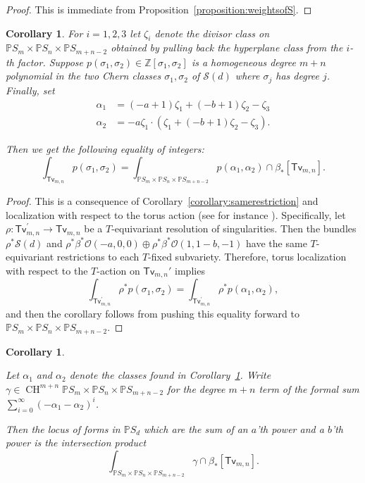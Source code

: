 \documentclass[12pt]{article}
\theoremstyle{plain}
\newtheorem{corollary}[theorem]{Corollary}
\theoremstyle{remark}
\renewcommand{\P}{\mathbb{P}}
\newcommand{\CH}{\operatorname{CH}}
\newcommand{\Z}{\mathbb{Z}}
\renewcommand{\O}{\mathscr{O}}
\renewcommand{\S}{\mathscr{S}}
\newcommand{\transvectant}{\mathsf{Tv}}
\begin{document}
\begin{proof}
    \label{proof:samerestriction}
    This is immediate from Proposition~\ref{proposition:weightsofS}.
\end{proof}


\begin{corollary}
    \label{corollary:intersectionnumbers}
    For $i = 1,2,3$ let $\zeta_{i}$ denote the divisor class on $\P S_{m} \times \P S_{n} \times \P S_{m+n-2}$ obtained by pulling back the hyperplane class from the $i$-th factor.  Suppose $p(\sigma_1,\sigma_2) \in \Z[\sigma_1,\sigma_2]$ is a homogeneous degree $m+n$ polynomial in the two Chern classes $\sigma_1,\sigma_2$ of $\S(d)$ where $\sigma_j$ has degree $j$.   Finally, set
    \begin{align*}
        \alpha_{1} &= (-a+1)\zeta_1 + (-b+1)\zeta_2 - \zeta_3\\
        \alpha_{2} &= -a\zeta_1 \cdot \left(\zeta_1 + (-b+1)\zeta_2 - \zeta_3\right).
    \end{align*}

    Then we get the following equality of integers: \[\int_{\transvectant_{m,n}} p(\sigma_1,\sigma_2) = \int_{\P S_{m} \times \P S_{n} \times \P S_{m+n-2}} p(\alpha_1,\alpha_2) \cap \beta_{*}[\transvectant_{m,n}].\]
\end{corollary}

\begin{proof}
    \label{proof:intersectionnumbers}
    This is a consequence of Corollary~\ref{corollary:samerestriction} and localization with respect to the torus action (see for instance \cite{edidin1998localization}).  Specifically, let $\rho: \transvectant_{m,n}^{'} \to \transvectant_{m,n}$ be a $T$-equivariant resolution of singularities. Then the bundles $\rho^{*}\S(d)$ and $\rho^{*}\beta^{*}\O(-a,0,0) \oplus \rho^{*}\beta^{*}\O(1,1-b,-1)$ have the same $T$-equivariant restrictions to each $T$-fixed subvariety. Therefore, torus localization with respect to the $T$-action on $\transvectant_{m,n}'$ implies $$\int_{\transvectant_{m,n}^{'}} \rho^{*} p(\sigma_1,\sigma_2) = \int_{\transvectant_{m,n}^{'}} \rho^{*} p(\alpha_1,\alpha_2),$$ and then the corollary follows from pushing this equality forward to $\P S_{m} \times \P S_{n} \times \P S_{m+n-2}$.
\end{proof}

\begin{corollary}
    \label{corollary:solutioninprinciple}

    Let $\alpha_{1}$ and $\alpha_2$ denote the classes found in Corollary~\ref{corollary:intersectionnumbers}.  Write $\gamma \in \CH^{m+n} \P S_{m} \times \P S_{n} \times \P S_{m+n-2}$ for the degree $m+n$ term of the formal sum $\sum_{i=0}^{\infty} (-\alpha_{1}-\alpha_{2})^{i}$.

    Then the locus of forms in $\P S_{d}$ which are the sum of an $a$'th power and a $b$'th power is the intersection product \[\int_{\P S_{m} \times \P S_{n} \times \P S_{m+n-2}} \gamma \cap \beta_{*}[\transvectant_{m,n}].\]
\end{corollary}
\end{document}
